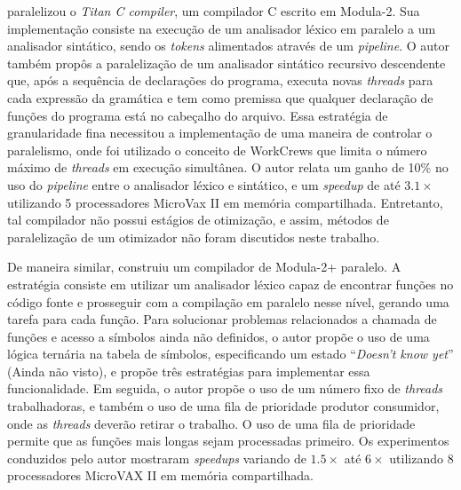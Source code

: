 \cite{vandevoorde1988parallel} paralelizou o \textit{Titan C compiler}, um compilador
C escrito em Modula-2. Sua implementação consiste na execução de um analisador léxico
em paralelo a um analisador sintático, sendo os \textit{tokens} alimentados
através de um \textit{pipeline}. O autor também propôs a paralelização de um
analisador sintático recursivo descendente que, após a sequência de declarações do programa, executa novas \textit{threads}
para cada expressão da gramática e tem
como premissa que qualquer declaração de funções do programa está no
cabeçalho do
arquivo. Essa estratégia de granularidade fina necessitou a implementação de
uma maneira de controlar o paralelismo, onde foi utilizado o conceito de
WorkCrews \citep{vandevoorde1988workcrews} que limita o número máximo de
\textit{threads} em execução simultânea. O autor relata um ganho de 10\% no
uso do \textit{pipeline} entre o analisador léxico e sintático, e um
\textit{speedup} de até $3.1\times$ utilizando 5 processadores MicroVax II em
memória compartilhada. Entretanto, tal compilador não possui estágios de
otimização, e assim, métodos de paralelização de um otimizador não foram discutidos neste trabalho.

De maneira similar, \cite{wortman1992} construiu um compilador de Modula-2+
paralelo. A estratégia consiste em utilizar um analisador léxico capaz de
encontrar funções no código fonte e prosseguir com a compilação em paralelo
nesse nível, gerando uma tarefa para cada função. Para solucionar problemas
relacionados a chamada de funções e
acesso a símbolos ainda não definidos, o autor propõe o uso de
uma lógica ternária na tabela de símbolos, especificando um estado
``\textit{Doesn't know yet}'' (Ainda não visto), e propõe três estratégias para
implementar essa funcionalidade. Em seguida, o autor propõe o uso de
um número fixo de \textit{threads} trabalhadoras, e também o uso de uma fila de
prioridade produtor consumidor, onde as \textit{threads} deverão retirar o trabalho.
O uso de uma fila de prioridade permite que as funções mais longas sejam
processadas primeiro. Os experimentos conduzidos pelo autor mostraram
\textit{speedups} variando de $1.5\times$ até $6\times$ utilizando 8
processadores MicroVAX II em memória compartilhada.

